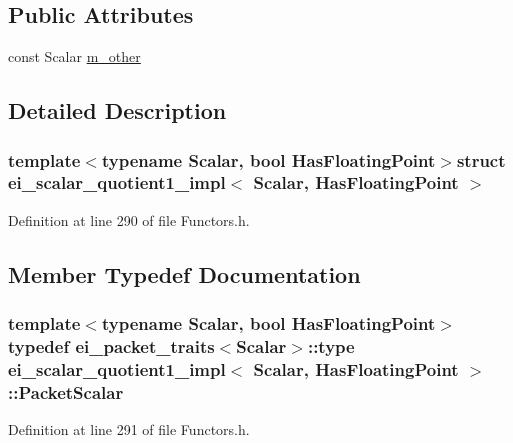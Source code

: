 \subsection*{Public Attributes}
\begin{DoxyCompactItemize}
\item 
const Scalar \hyperlink{structei__scalar__quotient1__impl_ae328ebe6f6bb2975a481f0a2728fb8e7}{m\-\_\-other}
\end{DoxyCompactItemize}


\subsection{Detailed Description}
\subsubsection*{template$<$typename Scalar, bool Has\-Floating\-Point$>$struct ei\-\_\-scalar\-\_\-quotient1\-\_\-impl$<$ Scalar, Has\-Floating\-Point $>$}



Definition at line 290 of file Functors.\-h.



\subsection{Member Typedef Documentation}
\hypertarget{structei__scalar__quotient1__impl_a89cd06ed6809fbe84652ae5f4e4687e9}{
\subsubsection[{Packet\-Scalar}]{\setlength{\rightskip}{0pt plus 5cm}template$<$typename Scalar, bool Has\-Floating\-Point$>$ typedef {\bf ei\-\_\-packet\-\_\-traits}$<$Scalar$>$\-::{\bf type} {\bf ei\-\_\-scalar\-\_\-quotient1\-\_\-impl}$<$ Scalar, Has\-Floating\-Point $>$\-::{\bf Packet\-Scalar}}}\label{structei__scalar__quotient1__impl_a89cd06ed6809fbe84652ae5f4e4687e9}


Definition at line 291 of file Functors.\-h.



